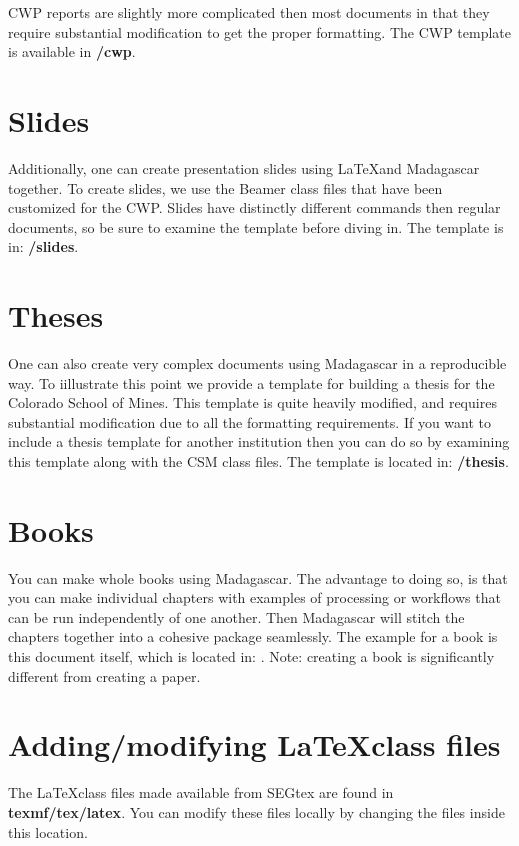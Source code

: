 CWP reports are slightly more complicated then most documents in that they require substantial modification to get the proper formatting.  The CWP template is available in \textbf{\exampledir/cwp}.  

\section{Slides}

Additionally, one can create presentation slides using \LaTeX  and Madagascar together.  To create slides, we use the Beamer class files that have been customized for the CWP.  Slides have distinctly different commands then regular documents, so be sure to examine the template before diving in.  The template is in: \textbf{\exampledir/slides}.  

\section{Theses}

One can also create very complex documents using Madagascar in a reproducible way.  To iillustrate this point we provide a template for building a thesis for the Colorado School of Mines.  This template is quite heavily modified, and requires substantial modification due to all the formatting requirements.  If you want to include a thesis template for another institution then you can do so by examining this template along with the CSM class files.  The template is located in: \textbf{\exampledir/thesis}.

\section{Books}

You can make whole books using Madagascar.  The advantage to doing so, is that you can make individual chapters with examples of processing or workflows that can be run independently of one another.  Then Madagascar will stitch the chapters together into a cohesive package seamlessly.  The example for a book is this document itself, which is located in: \textbf{\maindir}.  Note: creating a book is significantly different from creating a paper.

\section{Adding/modifying \LaTeX class files}

The \LaTeX class files made available from SEGtex are found in \textbf{texmf/tex/latex}.  You can modify these files locally by changing the files inside this location.  

